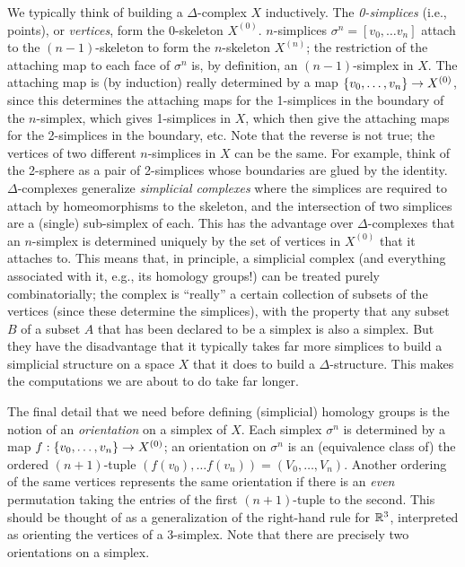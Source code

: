 \bsk


We typically think of building a $\Delta$-complex $X$ inductively. 
The {\it 0-simplices}
(i.e., points), or {\it vertices}, form the 0-skeleton 
$X^{(0)}$. $n$-simplices $\sigma^n = [v_0,\ldots v_n]$ attach 
to the $(n-1)$-skeleton
to form the $n$-skeleton $X^{(n)}$; the restriction
of the attaching map to each face of $\sigma^n$ is, by definition,
an $(n-1)$-simplex in $X$. The attaching map is (by induction)
really determined by a map $\{v_0,\ldots ,v_n\}\rightarrow X^{(0)}$, since this 
determines the attaching maps for the 1-simplices in the boundary of the
$n$-simplex, which 
gives 1-simplices in $X$, which then give the attaching maps for
the 2-simplices in the boundary, etc. Note that the reverse is not true;
the vertices of two different $n$-simplices in $X$ can be the same.
For example, think of the 2-sphere as a pair of 2-simplices whose 
boundaries are glued by the identity. $\Delta$-complexes generalize
{\it simplicial complexes} where the simplices are required to attach
by homeomorphisms to the skeleton, and the intersection of two 
simplices are a (single) sub-simplex of each. This has the advantage
over $\Delta$-complexes that an $n$-simplex is determined uniquely
by the set of vertices in $X^{(0)}$ that it attaches to. This means that,
in principle, a simplicial complex (and everything associated with it, e.g., 
its homology groups!) can be treated purely combinatorially;
the complex is ``really'' a certain collection of subsets of the vertices
(since these determine the simplices), with the property that any subset $B$
of a subset $A$ that has been declared to be a simplex is also a simplex.
But they have the disadvantage that it typically takes far more
simplices to build a simplicial structure on a space $X$ that it does to build a 
$\Delta$-structure. This makes the computations we are about to do take 
far longer.

\msk

The final detail that we need before defining (simplicial) homology
groups is the notion of an {\it orientation} on a simplex of $X$.
Each simplex $\sigma^n$ is determined by a map 
$f:\{v_0,\ldots ,v_n\}\rightarrow X^{(0)}$; an orientation on $\sigma^n$ is an
(equivalence class of) the ordered $(n+1)$-tuple $(f(v_0),\ldots f(v_n)) = (V_0,\ldots ,V_n)$.
Another ordering of the
same vertices represents the same orientation if there is an {\it even} permutation
taking the entries of the first $(n+1)$-tuple to the second. This should be thought 
of as a generalization of the right-hand rule for ${\Bbb R}^3$, interpreted as
orienting the vertices of a 3-simplex. Note that there are precisely two
orientations on a simplex.

